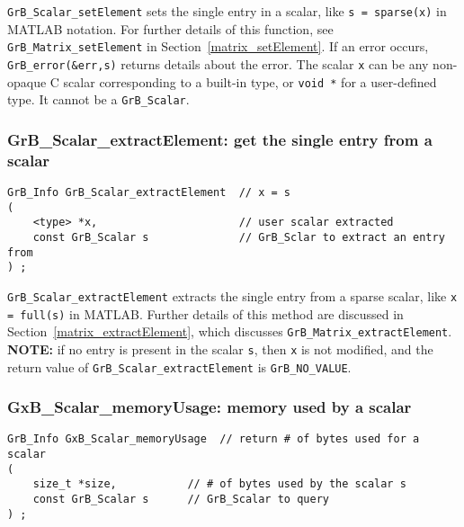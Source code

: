 \documentclass[12pt]{article}
\begin{document}
\verb'GrB_Scalar_setElement' sets the single entry in a scalar, like
\verb's = sparse(x)' in MATLAB notation.  For further details of this function,
see \verb'GrB_Matrix_setElement' in Section~\ref{matrix_setElement}.
If an error occurs, \verb'GrB_error(&err,s)' returns details about the error.
The scalar \verb'x' can be any non-opaque C scalar corresponding to
a built-in type, or \verb'void *' for a user-defined type.  It cannot be
a \verb'GrB_Scalar'.

\newpage
\subsubsection{{\sf GrB\_Scalar\_extractElement:} get the single entry from a scalar}
\label{scalar_extractElement}

\begin{mdframed}[userdefinedwidth=6in]
{\footnotesize
\begin{verbatim}
GrB_Info GrB_Scalar_extractElement  // x = s
(
    <type> *x,                      // user scalar extracted
    const GrB_Scalar s              // GrB_Sclar to extract an entry from
) ;
\end{verbatim} } \end{mdframed}

\verb'GrB_Scalar_extractElement' extracts the single entry from a sparse
scalar, like \verb'x = full(s)' in MATLAB.  Further details of this method are
discussed in Section~\ref{matrix_extractElement}, which discusses
\verb'GrB_Matrix_extractElement'.  {\bf NOTE: }  if no entry is present in the
scalar \verb's', then \verb'x' is not modified, and the return value of
\verb'GrB_Scalar_extractElement' is \verb'GrB_NO_VALUE'.

\subsubsection{{\sf GxB\_Scalar\_memoryUsage:} memory used by a scalar}
\label{scalar_memusage}

\begin{mdframed}[userdefinedwidth=6in]
{\footnotesize
\begin{verbatim}
GrB_Info GxB_Scalar_memoryUsage  // return # of bytes used for a scalar
(
    size_t *size,           // # of bytes used by the scalar s
    const GrB_Scalar s      // GrB_Scalar to query
) ;
\end{verbatim} } \end{mdframed}
\end{document}
